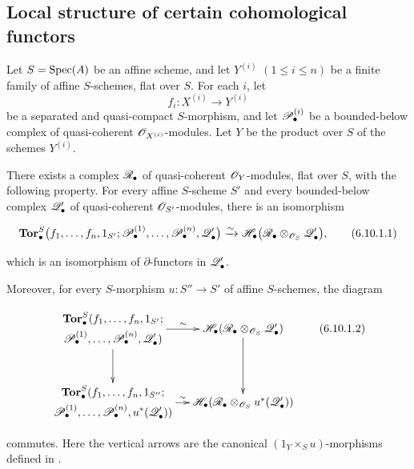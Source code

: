 \subsection{Local structure of certain cohomological functors}
\label{subsection:III.6.10}
\label{III.6.10}

\begin{proposition}[6.10.1]
\label{III.6.10.1}
Let $S=\operatorname{Spec}(A)$ be an affine scheme, and let
$Y^{(i)}$ $(1\leq i\leq n)$ be a finite family of affine
$S$-schemes, flat over $S$.  For each $i$, let
\[
  f_i:X^{(i)}\longrightarrow Y^{(i)}
\]
be a separated and quasi-compact $S$-morphism, and let
$\mathscr{P}_\bullet^{(i)}$ be a bounded-below complex of
quasi-coherent $\mathscr{O}_{X^{(i)}}$-modules.  Let $Y$ be the product
over $S$ of the schemes $Y^{(i)}$.

There exists a complex $\mathscr{R}_\bullet$ of quasi-coherent
$\mathscr{O}_Y$-modules, flat over $S$, with the following property.
For every affine $S$-scheme $S'$ and every bounded-below complex
$\mathscr{Q}_\bullet'$ of quasi-coherent $\mathscr{O}_{S'}$-modules, there is
an isomorphism
\begin{env}[6.10.1.1]
\label{III.6.10.1.1}
\[
  \mathbf{Tor}_\bullet^S
  \bigl(
    f_1,\ldots,f_n,1_{S'};
    \sh P_\bullet^{(1)},\ldots,\sh P_\bullet^{(n)},
    \sh Q_\bullet'
  \bigr)
  \xrightarrow{\sim}
  \sh H_\bullet
  \bigl(
    \sh R_\bullet\otimes_{\sh O_S}\sh Q_\bullet'
  \bigr),
  \tag{6.10.1.1}\label{III.6.10.1.1.eq}
\]
\end{env}
which is an isomorphism of $\partial$-functors in
$\mathscr{Q}_\bullet'$.

Moreover, for every $S$-morphism
$u:S''\to S'$ of affine $S$-schemes, the diagram
\begin{env}[6.10.1.2]
\label{III.6.10.1.2}
\[
\xymatrix@C=12pt@R=30pt{
  {\begin{gathered}
    \mathbf{Tor}_\bullet^S
    (f_1,\ldots,f_n,1_{S'};\\
    \sh P_\bullet^{(1)},\ldots,\sh P_\bullet^{(n)},
    \sh Q_\bullet')
  \end{gathered}}
  \ar[r]^-{\sim}\ar[d]
  &
  {\sh H_\bullet
    (\sh R_\bullet\otimes_{\sh O_S}\sh Q_\bullet')}
  \ar[d]
  \\
  {\begin{gathered}
    \mathbf{Tor}_\bullet^S
    (f_1,\ldots,f_n,1_{S''};\\
    \sh P_\bullet^{(1)},\ldots,\sh P_\bullet^{(n)},
    u^*(\sh Q_\bullet'))
  \end{gathered}}
  \ar[r]^-{\sim}
  &
  {\sh H_\bullet
    (\sh R_\bullet\otimes_{\sh O_S}u^*(\sh Q_\bullet'))}
}
\tag{6.10.1.2}\label{III.6.10.1.2.eq}
\]
\end{env}
commutes.  Here the vertical arrows are the canonical
$(1_Y\times_Su)$-morphisms defined in .
\end{proposition}

